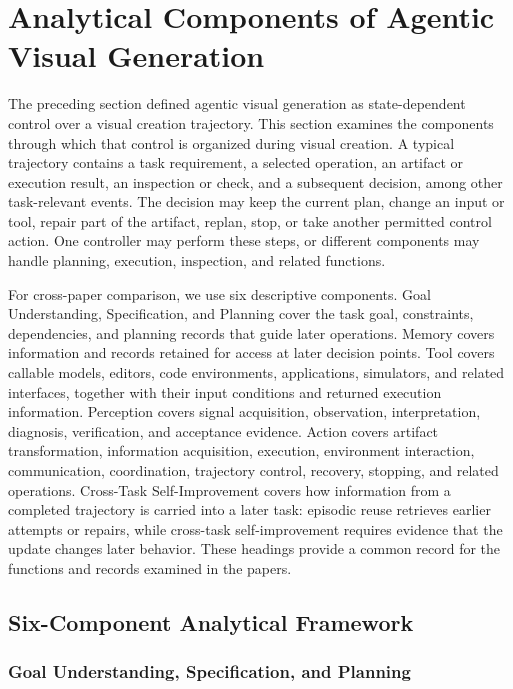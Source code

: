 \section{Analytical Components of Agentic Visual Generation}
\label{sec:components}

The preceding section defined agentic visual generation as state-dependent control over a visual creation trajectory. This section examines the components through which that control is organized during visual creation. A typical trajectory contains a task requirement, a selected operation, an artifact or execution result, an inspection or check, and a subsequent decision, among other task-relevant events. The decision may keep the current plan, change an input or tool, repair part of the artifact, replan, stop, or take another permitted control action. One controller may perform these steps, or different components may handle planning, execution, inspection, and related functions.

For cross-paper comparison, we use six descriptive components. Goal Understanding, Specification, and Planning cover the task goal, constraints, dependencies, and planning records that guide later operations. Memory covers information and records retained for access at later decision points. Tool covers callable models, editors, code environments, applications, simulators, and related interfaces, together with their input conditions and returned execution information. Perception covers signal acquisition, observation, interpretation, diagnosis, verification, and acceptance evidence. Action covers artifact transformation, information acquisition, execution, environment interaction, communication, coordination, trajectory control, recovery, stopping, and related operations. Cross-Task Self-Improvement covers how information from a completed trajectory is carried into a later task: episodic reuse retrieves earlier attempts or repairs, while cross-task self-improvement requires evidence that the update changes later behavior. These headings provide a common record for the functions and records examined in the papers.


\subsection{Six-Component Analytical Framework}
\label{sec:analytical-framework}



\subsubsection{Goal Understanding, Specification, and Planning}

